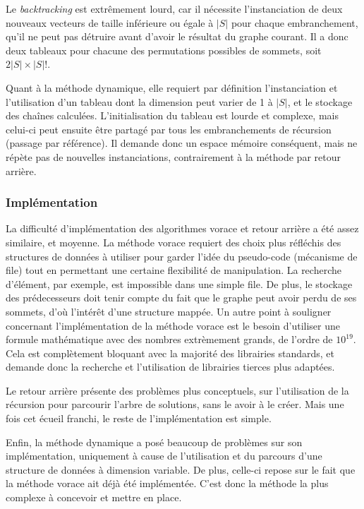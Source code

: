 \documentclass[10pt,a4paper]{article}
\begin{document}
Le \textit{backtracking} est extrêmement lourd, car il nécessite l'instanciation de deux nouveaux vecteurs de taille inférieure ou égale à $ |S| $ pour chaque embranchement, qu'il ne peut pas détruire avant d'avoir le résultat du graphe courant. Il a donc deux tableaux pour chacune des permutations possibles de sommets, soit $ 2 |S| \times |S|!$.

Quant à la méthode dynamique, elle requiert par définition l'instanciation et l'utilisation d'un tableau dont la dimension peut varier de 1 à $|S|$, et le stockage des chaînes calculées. L'initialisation du tableau est lourde et complexe, mais celui-ci peut ensuite être partagé par tous les embranchements de récursion (passage par référence). Il demande donc un espace mémoire conséquent, mais ne répète pas de nouvelles instanciations, contrairement à la méthode par retour arrière.

\subsubsection{Implémentation}

La difficulté d'implémentation des algorithmes vorace et retour arrière a été assez similaire, et moyenne. La méthode vorace requiert des choix plus réfléchis des structures de données à utiliser pour garder l'idée du pseudo-code (mécanisme de file) tout en permettant une certaine flexibilité de manipulation. La recherche d'élément, par exemple, est impossible dans une simple file. De plus, le stockage des prédecesseurs doit tenir compte du fait que le graphe peut avoir perdu de ses sommets, d'où l'intérêt d'une structure mappée.
Un autre point à souligner concernant l'implémentation de la méthode vorace est le besoin d'utiliser une formule mathématique avec des nombres extrèmement grands, de l'ordre de $10^{19}$. Cela est complètement bloquant avec la majorité des librairies standards, et demande donc la recherche et l'utilisation de librairies tierces plus adaptées.

Le retour arrière présente des problèmes plus conceptuels, sur l'utilisation de la récursion pour parcourir l'arbre de solutions, sans le avoir à le créer. Mais une fois cet écueil franchi, le reste de l'implémentation est simple.

Enfin, la méthode dynamique a posé beaucoup de problèmes sur son implémentation, uniquement à cause de l'utilisation et du parcours d'une structure de données à dimension variable. De plus, celle-ci repose sur le fait que la méthode vorace ait déjà été implémentée. C'est donc la méthode la plus complexe à concevoir et mettre en place.
\end{document}
